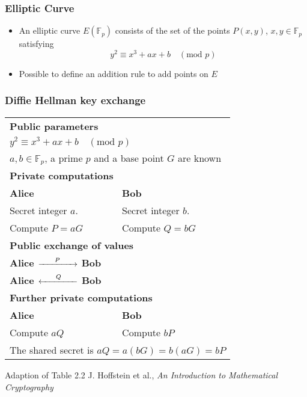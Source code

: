 \begin{frame}
  \frametitle{Elliptic Curve}
  \begin{itemize}
  \item{
  An elliptic curve $E(\mathbb{F}_p)$ consists of the set of the points $P(x,y)$, $x,y \in \mathbb{F}_p$ satisfying
  \begin{equation*}
  y^2 \equiv x^3 + ax + b \quad (\text{mod } p)
  \end{equation*}
  }
  \item{
  Possible to define an addition rule to add points on $E$
  }
  \end{itemize}
\end{frame}
\begin{frame}[shrink=20]
  \frametitle{Diffie Hellman key exchange}
  \begin{table}
  \begin{tabular}{|p{5cm} p{5cm} |}
      \hline			
      \multicolumn{2}{|p{10cm}|}{\rule{0em}{1.2em}\bf{Public parameters}}\\
      \multicolumn{2}{|p{10cm}|}{$ y^2 \equiv x^3 + ax + b \quad (\text{mod } p)$}\\
      \multicolumn{2}{|p{10cm}|}{$a,b \in \mathbb{F}_p$, a prime $p$ and a base point $G$ are known}\\
      \hline
      \multicolumn{2}{|p{10cm}|}{\rule{0em}{1.2em}\bf{Private computations}}\\
      \bf{\small{Alice}} & \bf{\small{Bob}}\\
      Secret integer $a$. & Secret integer $b$.\\
      Compute $P = aG$ &  Compute $Q = bG$ \\
      \hline
      \multicolumn{2}{|p{10cm}|}{\rule{0em}{1.2em}\bf{Public exchange of values}}\\
      \multicolumn{2}{|p{10cm}|}{
      \bf{\small{Alice}} $\xrightarrow{\hspace*{0.6cm}P\hspace*{0.6cm}}$ \bf{\small{Bob}}
      } \\
      \multicolumn{2}{|p{10cm}|}{
      \bf{\small{Alice}} $\xleftarrow{\hspace*{0.6cm}Q\hspace*{0.6cm}}$ \bf{\small{Bob}}
      }\\
      \hline
      \multicolumn{2}{|p{10cm}|}{\rule{0em}{1.2em}\bf{Further private computations}}\\
      \bf{\small{Alice}} & \bf{\small{Bob}}\\
      Compute $aQ$ & Compute $bP$ \\
      \multicolumn{2}{|p{10cm}|}{
      The shared secret is $aQ = a(bG) = b(aG) = bP$}\\ \hline
    \end{tabular}
    \end{table}
    \vfill
    \tiny{Adaption of Table 2.2 J. Hoffstein et al., \emph{An Introduction to Mathematical Cryptography}}
\end{frame}
